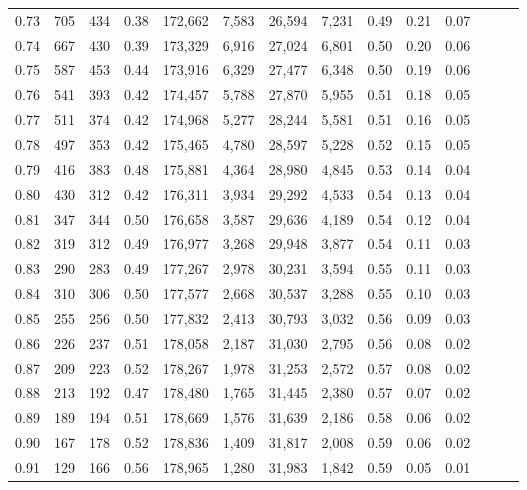\begin{tabular}{rrrrrrrrrrrrrr}
0.73 &    705 &  434 &  0.38 &  172,662 &    7,583 &  26,594 &   7,231 &  0.49 &  0.21 &      0.07 \\
0.74 &    667 &  430 &  0.39 &  173,329 &    6,916 &  27,024 &   6,801 &  0.50 &  0.20 &      0.06 \\
0.75 &    587 &  453 &  0.44 &  173,916 &    6,329 &  27,477 &   6,348 &  0.50 &  0.19 &      0.06 \\
0.76 &    541 &  393 &  0.42 &  174,457 &    5,788 &  27,870 &   5,955 &  0.51 &  0.18 &      0.05 \\
0.77 &    511 &  374 &  0.42 &  174,968 &    5,277 &  28,244 &   5,581 &  0.51 &  0.16 &      0.05 \\
0.78 &    497 &  353 &  0.42 &  175,465 &    4,780 &  28,597 &   5,228 &  0.52 &  0.15 &      0.05 \\
0.79 &    416 &  383 &  0.48 &  175,881 &    4,364 &  28,980 &   4,845 &  0.53 &  0.14 &      0.04 \\
0.80 &    430 &  312 &  0.42 &  176,311 &    3,934 &  29,292 &   4,533 &  0.54 &  0.13 &      0.04 \\
0.81 &    347 &  344 &  0.50 &  176,658 &    3,587 &  29,636 &   4,189 &  0.54 &  0.12 &      0.04 \\
0.82 &    319 &  312 &  0.49 &  176,977 &    3,268 &  29,948 &   3,877 &  0.54 &  0.11 &      0.03 \\
0.83 &    290 &  283 &  0.49 &  177,267 &    2,978 &  30,231 &   3,594 &  0.55 &  0.11 &      0.03 \\
0.84 &    310 &  306 &  0.50 &  177,577 &    2,668 &  30,537 &   3,288 &  0.55 &  0.10 &      0.03 \\
0.85 &    255 &  256 &  0.50 &  177,832 &    2,413 &  30,793 &   3,032 &  0.56 &  0.09 &      0.03 \\
0.86 &    226 &  237 &  0.51 &  178,058 &    2,187 &  31,030 &   2,795 &  0.56 &  0.08 &      0.02 \\
0.87 &    209 &  223 &  0.52 &  178,267 &    1,978 &  31,253 &   2,572 &  0.57 &  0.08 &      0.02 \\
0.88 &    213 &  192 &  0.47 &  178,480 &    1,765 &  31,445 &   2,380 &  0.57 &  0.07 &      0.02 \\
0.89 &    189 &  194 &  0.51 &  178,669 &    1,576 &  31,639 &   2,186 &  0.58 &  0.06 &      0.02 \\
0.90 &    167 &  178 &  0.52 &  178,836 &    1,409 &  31,817 &   2,008 &  0.59 &  0.06 &      0.02 \\
0.91 &    129 &  166 &  0.56 &  178,965 &    1,280 &  31,983 &   1,842 &  0.59 &  0.05 &      0.01 \\

\end{tabular}
